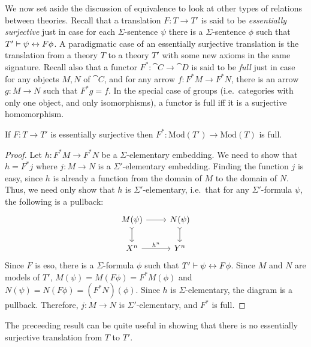 We now set aside the discussion of equivalence to look at other types
of relations between theories.  Recall that a translation $F:T\to T'$
is said to be \emph{essentially surjective} just in case for each
$\Sigma$-sentence $\psi$ there is a $\Sigma$-sentence $\phi$ such that
$T'\vdash \psi\leftrightarrow F\phi$.  A paradigmatic case of an essentially
surjective translation is the translation from a theory $T$ to a
theory $T'$ with some new axioms in the same signature.  Recall also
that a functor $F^*:\cat{C}\to \cat{D}$ is said to be \emph{full} just
in case for any objects $M,N$ of $\cat{C}$, and for any arrow
$f:F^*M\to F^*N$, there is an arrow $g:M\to N$ such that $F^*g=f$.  In
the special case of groups (i.e.\ categories with only one object, and
only isomorphisms), a functor is full iff it is a surjective
homomorphism.

\begin{prop} If $F:T\to T'$ is essentially surjective then
  $F^*:\mathrm{Mod}(T')\to \mathrm{Mod}(T)$ is
  full.  \label{rupaul} \end{prop}

\begin{proof} Let $h:F^*M\to F^*N$ be a $\Sigma$-elementary embedding.
  We need to show that $h=F^*j$ where $j:M\to N$ is a
  $\Sigma '$-elementary embedding.  Finding the function $j$ is easy,
  since $h$ is already a function from the domain of $M$ to the domain
  of $N$.  Thus, we need only show that $h$ is $\Sigma '$-elementary,
  i.e.\ that for any $\Sigma '$-formula $\psi$, the following is a
  pullback:
  \[ \begin{tikzcd} M(\psi ) \arrow{r}{} \arrow[>->]{d}{} & N(\psi )
      \arrow[>->]{d}{}
      \\
      X^n \arrow{r}{h^n} & Y^n \end{tikzcd} \] Since $F$ is eso, there
  is a $\Sigma$-formula $\phi$ such that $T'\vdash \psi\leftrightarrow F\phi$.
  Since $M$ and $N$ are models of $T'$,
  $M(\psi )=M(F\phi )=F^*M(\phi )$ and
  $N(\psi )=N(F\phi )=(F^*N)(\phi )$.  Since $h$ is
  $\Sigma$-elementary, the diagram is a pullback.  Therefore,
  $j:M\to N$ is $\Sigma '$-elementary, and $F^*$ is full. \end{proof}

The preceeding result can be quite useful in showing that there is no
essentially surjective translation from $T$ to $T'$.

